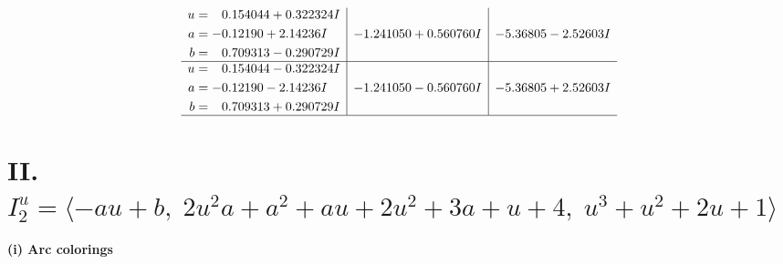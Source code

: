 \documentclass[1p]{elsarticle_modified}
\theoremstyle{definition}
\begin{document}
$$\begin{array}{c|c|c}
\begin{aligned}
u &= \phantom{-}0.154044 + 0.322324 I \\
a &= -0.12190 + 2.14236 I \\
b &= \phantom{-}0.709313 - 0.290729 I\end{aligned}
 & -1.241050 + 0.560760 I & -5.36805 - 2.52603 I \\ \hline\begin{aligned}
u &= \phantom{-}0.154044 - 0.322324 I \\
a &= -0.12190 - 2.14236 I \\
b &= \phantom{-}0.709313 + 0.290729 I\end{aligned}
 & -1.241050 - 0.560760 I & -5.36805 + 2.52603 I\\
 \hline 
 \end{array}$$\newpage\newpage\renewcommand{\arraystretch}{1}
\centering \section*{II. $I^u_{2}= \langle - a u+b,\;2 u^2 a+a^2+a u+2 u^2+3 a+u+4,\;u^3+u^2+2 u+1 \rangle$}
\flushleft \textbf{(i) Arc colorings}\\
\end{document}
